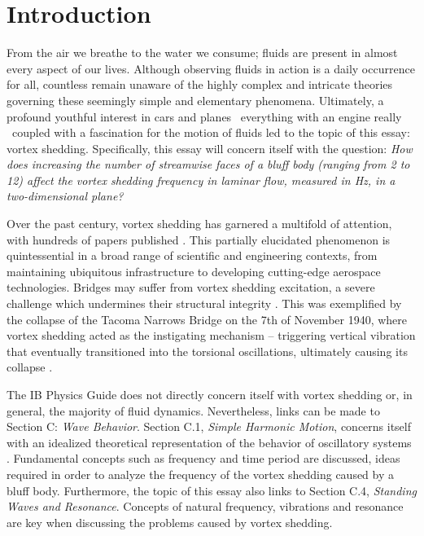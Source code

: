 \section{Introduction}
From the air we breathe to the water we consume; fluids are present in almost every aspect of our lives. Although observing fluids in action is a daily occurrence for all, countless remain unaware of the highly complex and intricate theories governing these seemingly simple and elementary phenomena. Ultimately, a profound youthful interest in cars and planes \textemdash\ everything with an engine really \textemdash\ coupled with a fascination for the motion of fluids led to the topic of this essay: vortex shedding. Specifically, this essay will concern itself with the question: \textit{How does increasing the number of streamwise faces of a bluff body (ranging from 2 to 12) affect the vortex shedding frequency in laminar flow, measured in \si{\hertz}, in a two-dimensional plane?}

Over the past century, vortex shedding has garnered a multifold of attention, with hundreds of papers published \parencite[61]{buresti1998}. This partially elucidated phenomenon is quintessential in a broad range of scientific and engineering contexts, from maintaining ubiquitous infrastructure to developing cutting-edge aerospace technologies. Bridges may suffer from vortex shedding excitation, a severe challenge which undermines their structural integrity \parencite[1040]{jurado2012}. This was exemplified by the collapse of the Tacoma Narrows Bridge on the 7th of November 1940, where vortex shedding acted as the instigating mechanism -- triggering vertical vibration that eventually transitioned into the torsional oscillations, ultimately causing its collapse \parencite{tacoma_bridge_vibrations}.

The IB Physics Guide \parencite{ib_physics_2025} does not directly concern itself with vortex shedding or, in general, the majority of fluid dynamics. Nevertheless, links can be made to Section C: \textit{Wave Behavior}. Section C.1, \textit{Simple Harmonic Motion}, concerns itself with an idealized theoretical representation of the behavior of oscillatory systems \parencite[313]{allum2023}. Fundamental concepts such as frequency and time period are discussed, ideas required in order to analyze the frequency of the vortex shedding caused by a bluff body. Furthermore, the topic of this essay also links to Section C.4, \textit{Standing Waves and Resonance}. Concepts of natural frequency, vibrations and resonance are key when discussing the problems caused by vortex shedding.





